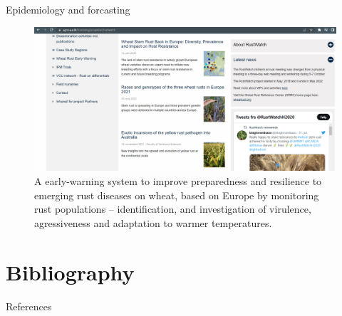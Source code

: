 \documentclass[10pt,dvipsnames,ignorenonframetext,aspectratio=169]{beamer}
\begin{document}
\begin{frame}{Epidemiology and forcasting}
\protect\hypertarget{epidemiology-and-forcasting}{}
\begin{figure}
\includegraphics[width=0.95\linewidth]{../images/rust_epidemiology_networking_forcasting} \caption{A early-warning system to improve preparedness and resilience to emerging rust diseases on wheat, based on Europe by monitoring rust populations -- identification, and investigation of virulence, agressiveness and adaptation to warmer temperatures.}\label{fig:rust-epidemiology-network}
\end{figure}
\end{frame}

\hypertarget{bibliography}{%
\section{Bibliography}\label{bibliography}}

\begin{frame}{References}
\protect\hypertarget{references}{}
\end{frame}
\end{document}
